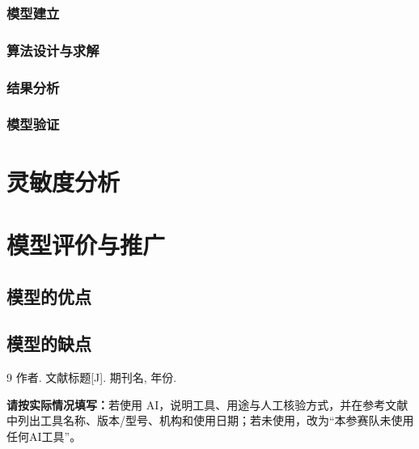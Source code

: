 \documentclass[12pt]{article}
\begin{document}
\subsubsection{模型建立}

\subsubsection{算法设计与求解}

\subsubsection{结果分析}

\subsubsection{模型验证}

\section{灵敏度分析}

\section{模型评价与推广}

\subsection{模型的优点}

\subsection{模型的缺点}

\begin{thebibliography}{9}
 作者. 文献标题[J]. 期刊名, 年份.
\end{thebibliography}

\begin{aideclaration}[AI 工具使用声明]
\textbf{请按实际情况填写：}若使用 AI，说明工具、用途与人工核验方式，并在参考文献中列出工具名称、版本/型号、机构和使用日期；若未使用，改为“本参赛队未使用任何AI工具”。
\end{aideclaration}
\end{document}
